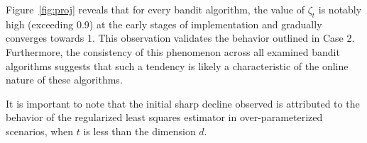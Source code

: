 Figure~\ref{fig:proj} reveals that for every bandit algorithm, the value of $\zeta_t$ is notably high (exceeding 0.9) at the early stages of implementation and gradually converges towards 1. This observation validates the behavior outlined in Case 2. Furthermore, the consistency of this phenomenon across all examined bandit algorithms suggests that such a tendency is likely a characteristic of the online nature of these algorithms.

It is important to note that the initial sharp decline observed is attributed to the behavior of the regularized least squares estimator in over-parameterized scenarios, when $t$ is less than the dimension $d$.









